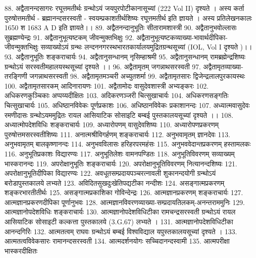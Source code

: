 88. अद्वैतानन्दसागरः					रघूत्तमतीर्थः
ग्रन्थोऽयं जयपुरपोटीकानासूच्यां (222 Vol II) दृश्यते । अस्य कर्ता पुरुषोत्तमतीर्थ - ब्रह्मानन्दसरस्वती - स्वयम्प्रकाशतीर्थशिष्यः रघूत्तमतीर्थ इति ज्ञायते । अस्य प्रतिलेखनकालः 1650 श 1683 A D इति ज्ञायते।।
89. अद्वैतनन्दानुभूतिः 					सीतारामशास्त्री 
90. अद्वैतानुभवोल्लासः					सुब्रह्मण्येन्द्रः
91. अद्वैतानुभूत्यष्टकम् 					जीवन्मुक्तभिक्षुः	
92. अद्वैतानुभूत्यष्टकव्याख्या-भावार्थदीपिका-जीवन्मुक्तभिक्षुः 
	  सव्याख्योऽयं ग्रन्थः लन्दननगरस्थभारतकार्यालयमुद्रितग्रन्थसूच्यां 
	  (IOL, Vol I दृश्यते )।।
93. अद्वैतानुभूतिः						शङ्कराचार्यः
94. अद्वैतानुसन्धानम् 					नृसिम्हाश्रमी
95. अद्वैतानुसन्धानम् 					रामब्रह्मेन्द्रशिष्यः
	  ग्रन्थोऽयं सरस्वतीमहालयस्थसूच्यां दृश्यते ।। 
96. अद्वैतामृतम् 							जगन्नाथसरस्वती
97. अद्वैतामृतव्याख्या-तरङ्गिणी 		जगन्नाथसरस्वती
98. अद्वैतामृतमञ्चरी						अच्युतशर्मा
99. अद्वैतामृतसारः						द्विजेन्द्रलालपुरकायस्थः 
100. अद्वैतामृतसारकम् 					आदिनारायणः
101. अद्वैतामोदः							वासुदेवशास्त्री अभ्यङ्करः
102. अधिकरणकुञ्चिकाः					अप्पय्यदीक्षितः
103. अदिकरणञ्जरी						चित्सुखाचार्यः
104. अधिकरणसङ्गतिः					चित्सुखाचार्यः
105. अधिष्ठानविवेकः					पूर्णप्रकाशः
106. अधिष्ठानविवेकः					प्रकाशानन्दः
107. अध्यात्मवासुदेवः					रमणीदासः
	   ग्रन्थोऽयममुद्रितः रायल आसियाटिक सोसाइटि बम्बई पुस्तकालयसूच्यां दृश्यते ।। 
108. अध्यात्मोपदेशविधिः 				शङ्कराचार्यः
109. अध्यारोपणम् 						वासुदेवशिष्यः
110. अध्यारोपणप्रकरणम् 				पुरुषोत्तमसरस्वतीशिष्यः
111. अनात्मश्रीविगर्हणम् 					शङ्कराचार्यः
112. अनुभवामृतम् 						ज्ञानदेवः
113. अनुभवामृतम् 						बालकृष्णानन्दः
114. अनुभवविलासः						हरिहरपरमहंसः 
115. अनुभववेदान्तप्रकरणम् 			हस्तामलकः
116. अनुभूतिप्रकाशः						विद्यारण्यः
117. अनुभूतिलेशः 						वामनपण्डितः
118. अनुभूतिविवरणम् सव्याख्यम्		भास्करानन्दः
119. अपरोक्षानुभूतिः						शङ्कराचार्यः
120. अपरोक्षानुभूतिविवरणम् 			नित्यानन्दशिष्यः
121. अपरोक्षानुभूतिदीपिका				विद्यारण्यः
122. अवधूतसम्प्रदायपञ्चरत्नावली 		शुकानन्दयोगी
	   ग्रन्थोऽयं बरोडापुस्तकालये लभ्यते 
123. अविदितसुखदुःखेतिपद्यटीका 		नन्दीशः
124. असङ्गात्मप्रकरणम् 				शङ्करभारतीतीर्थः
125. असङ्गात्मप्रकाशिका				गोविन्देन्द्रः
126. आत्मज्ञानप्रकरणम्					शङ्कराचार्यः
127. आत्मज्ञानप्रकरणदीपिका			पूर्णानुभवः
128. आत्मज्ञानविवरणव्याख्या-सम्प्रदायतिलकम्-अनन्तराममुनिः
129. आत्मज्ञानोपदेशविधिः				शङ्कराचार्यः
130. आत्मज्ञानोपदेशविधिटीका 		रामचन्द्रसरस्वती
ग्रन्थोऽयं रायल आसियाटिक सोसाइटी कल्कत्ता पुस्तकालये (3.G.67) लभ्यते ।
131. आत्मज्ञानोपदेशविधिटीका 		आनन्दगिरिः
132. आत्मतत्वम् 						राघवः
	   ग्रन्थोऽयं बम्बई विश्वविद्याल यपुस्तकालयसूच्यां दृश्यते । 
133. आत्मतत्वविवेकसारः 				रामानन्दसरस्वती
134. आत्मदर्शनयोगः					सच्चिदानन्दस्वामी 
135. आत्मपरीक्षा						भास्करदीक्षितः 
